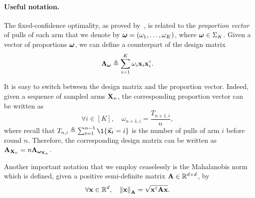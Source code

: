 \paragraph{Useful notation.}
The fixed-confidence optimality, as proved by~\cite{garivier2016tracknstop,russo2016ttts}, is related to the \emph{proportion vector} of pulls of each arm that we denote by ${\boldsymbol \omega} = (\omega_1,\ldots,\omega_K)$, where ${\boldsymbol \omega}\in\Sigma_K$. Given a vector of proportions ${\boldsymbol \omega}$, we can define a counterpart of the design matrix 
\[
    {\boldsymbol \Lambda}_{{\boldsymbol \omega}} \triangleq \sum_{i=1}^K \omega_i{\bf x}_i{\bf x}_i^\mathsf{\scriptscriptstyle T}.
\]

It is easy to switch between the design matrix and the proportion vector. Indeed, given a sequence of sampled arms ${\bf X}_n$, the corresponding proportion vector can be written as
\[
    \forall i\in [K], \quad \omega_{n+1,i} = \frac{T_{n+1,i}}{n},
\]
where recall that $T_{n,i} \eqdef \sum_{t=1}^{n-1} \1\{\hat{\bx_t} = i\}$ is the number of pulls of arm $i$ before round $n$. Therefore, the corresponding design matrix can be written as ${\bf A}_{{\bf X}_n}=n{\boldsymbol \Lambda}_{{\boldsymbol \omega}_{{\bf X}_n}}$.

Another important notation that we employ ceaselessly is the Mahalanobis norm which is defined, given a positive semi-definite matrix ${\bf A}\in\mathbb{R}^{d\times d}$, by
\[
    \forall {\bf x}\in\mathbb{R}^d, \quad \left\lVert{\bf x}\right\rVert_{{\bf A}} = \sqrt{{\bf x}^\mathsf{\scriptscriptstyle T}{\bf A}{\bf x}}.
\]
